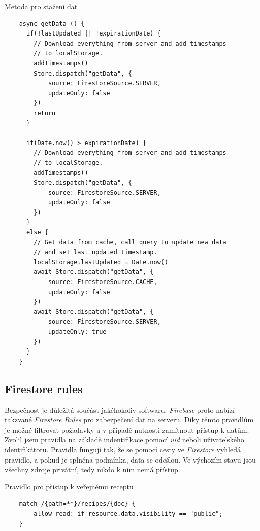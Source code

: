 \begin{listing}[H]
    \caption{Metoda pro stažení dat}
    \begin{verbatim}
    async getData () {
      if(!lastUpdated || !expirationDate) {
        // Download everything from server and add timestamps
        // to localStorage.
        addTimestamps()
        Store.dispatch("getData", {
            source: FirestoreSource.SERVER,
            updateOnly: false
        })
        return
      }

      if(Date.now() > expirationDate) {
        // Download everything from server and add timestamps
        // to localStorage.
        addTimestamps()
        Store.dispatch("getData", {
            source: FirestoreSource.SERVER,
            updateOnly: false
        })
      }
      else {
        // Get data from cache, call query to update new data
        // and set last updated timestamp.
        localStorage.lastUpdated = Date.now()
        await Store.dispatch("getData", {
            source: FirestoreSource.CACHE,
            updateOnly: false
        })
        await Store.dispatch("getData", {
            source: FirestoreSource.SERVER,
            updateOnly: true
        })
      }
    }
    \end{verbatim}
\end{listing}

\newpage

\subsection{Firestore rules}
Bezpečnost je důležitá součást jakéhokoliv softwaru. \emph{Firebase} proto nabízí takzvané \emph{Firestore Rules} pro zabezpečení dat na serveru.
Díky těmto pravidlům je možné filtrovat požadavky a v případě nutnosti zamítnout přístup k datům. Zvolil jsem pravidla na základě
indentifikace pomocí \emph{uid} neboli uživatelského identifikátoru. Pravidla fungují tak, že se pomocí cesty ve \emph{Firestore} vyhledá
pravidlo, a pokud je splněna podmínka, data se odešlou. Ve výchozím stavu jsou všechny zdroje privátní, tedy nikdo k nim nemá přístup.

\begin{listing}[H]
    \caption{Pravidlo pro přístup k veřejnému receptu}
    \begin{verbatim}
    match /{path=**}/recipes/{doc} {
        allow read: if resource.data.visibility == "public";
    }
    \end{verbatim}
\end{listing}

